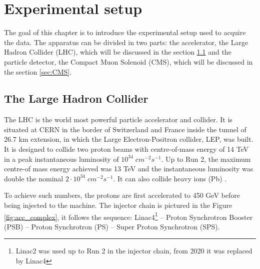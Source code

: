 \chapter{Experimental setup} \label{chap:experiment}

The goal of this chapter is to introduce the experimental setup used to acquire the data. The apparatus can be divided in two parts: the accelerator, the Large Hadron Collider (LHC), which will be discussed in the section \ref{sec:LHC} and the particle detector, the Compact Muon Solenoid (CMS), which will be discussed in the section \ref{sec:CMS}.

\section{The Large Hadron Collider}\label{sec:LHC}

The LHC is the world most powerful particle accelerator and collider. It is  situated at CERN in the border of Switzerland and France inside the tunnel of 26.7 km extension, in which the Large Electron-Positron collider, LEP, was built. It is designed to collide two proton beams with centre-of-mass energy of 14 TeV in a peak instantaneous luminosity of $10^{34} \; cm^{-2} s^{-1}$. Up to Run 2, the maximum centre-of mass energy achieved was 13 TeV and the instantaneous luminosity was double the nominal $2 \cdot 10^{34} \; cm^{-2} s^{-1}$. It can also collide heavy ions (Pb) \cite{Evans_2008}.

To achieve such numbers, the protons are first accelerated to 450 GeV before being injected to the machine. The injector chain is pictured in the Figure \ref{fig:acc_complex}, it follows the sequence: Linac4\footnote{Linac2 was used up to Run 2 in the injector chain, from 2020 it was replaced by Linac4} -- Proton Synchrotron Booster (PSB) -- Proton Synchrotron (PS) -- Super Proton Synchrotron (SPS). 

